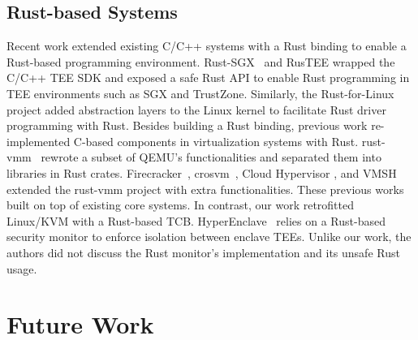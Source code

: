 \subsection{Rust-based Systems}
Recent work extended existing C/C++ systems with a Rust binding to enable
a Rust-based programming environment. Rust-SGX~\cite{rustsgx} and RusTEE
\cite{rustee} wrapped the C/C++ TEE SDK and exposed a safe Rust API
to enable Rust programming in TEE environments such as SGX and TrustZone.
Similarly, the Rust-for-Linux~\cite{Rust-for-Linux} project added
abstraction layers to the Linux kernel to facilitate Rust driver
programming with Rust.
Besides building a Rust binding, previous work re-implemented C-based
components in virtualization systems with Rust.
rust-vmm~\cite{rust-vmm} rewrote a subset of QEMU's functionalities
and separated them into libraries in Rust crates.
Firecracker~\cite{Firecracker}, crosvm~\cite{crosvm}, Cloud Hypervisor
\cite{CloudHypervisor}, and VMSH~\cite{VMSH} extended the
rust-vmm project with extra functionalities. These previous works
built on top of existing core systems. In contrast, our work
retrofitted Linux/KVM with a Rust-based TCB.
HyperEnclave~\cite{hyperenclave} relies on a Rust-based security
monitor to enforce isolation between enclave TEEs. Unlike
our work, the authors did not discuss the Rust monitor's implementation
and its unsafe Rust usage.

\section{Future Work}
